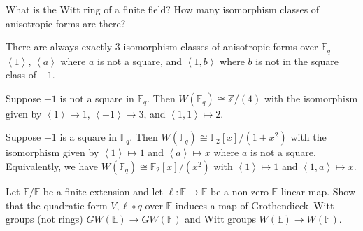 \documentclass[12 pt, letterpaper]{hmcpset}
\begin{document}

\begin{problem}[(1)]
	What is the Witt ring of a finite field? How many isomorphism classes of anisotropic forms are there?
\end{problem}

\begin{solution} 
	There are always exactly $3$ isomorphism classes of anisotropic forms over $\mathbb{F}_{q}$ --- $\left < 1 \right >$, $\left < a \right >$ where $a$ is not a square, and $\left < 1, b \right >$ where $b$ is not in the square class of $-1$.

	Suppose $-1$ is not a square in $\mathbb{F}_{q}$. Then $W(\mathbb{F}_{q}) \cong \mathbb{Z} / (4)$ with the isomorphism given by $\left < 1 \right > \mapsto 1$, $\left < -1 \right > \to 3$, and $\left < 1, 1 \right > \mapsto 2$.

	Suppose $-1$ is a square in $\mathbb{F}_{q}$. Then $W(\mathbb{F}_{q}) \cong \mathbb{F}_{2}[x] / (1 + x^{2})$ with the isomorphism given by $\left < 1 \right > \mapsto 1$ and $\left < a \right > \mapsto x$ where $a$ is not a square. Equivalently, we have $W(\mathbb{F}_{q}) \cong \mathbb{F}_{2}[x] / (x^{2})$ with $\left < 1 \right > \mapsto 1$ and $\left < 1, a \right > \mapsto x$. 
\end{solution}

\pagebreak

\begin{problem}[(2)]
	Let $\mathbb{E} / \mathbb{F}$ be a finite extension and let $\ell : \mathbb{E} \to \mathbb{F}$ be a non-zero $\mathbb{F}$-linear map. Show that the quadratic form $V, \ell \circ q$ over $\mathbb{F}$ induces a map of Grothendieck--Witt groups (not rings) $GW(\mathbb{E}) \to GW(\mathbb{F})$ and Witt groups  $W(\mathbb{E}) \to W(\mathbb{F})$.
\end{problem}
\end{document}
